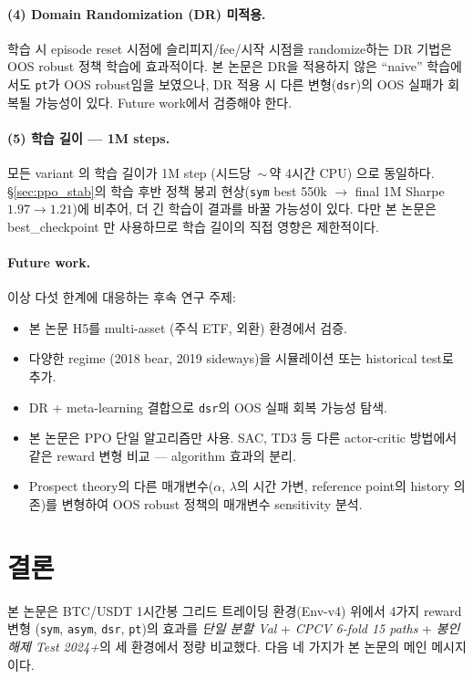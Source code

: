 \documentclass[11pt, a4paper]{article}
\begin{document}
\paragraph{(4) Domain Randomization (DR) 미적용.}
학습 시 episode reset 시점에 슬리피지/fee/시작 시점을 randomize하는 DR 기법은
OOS robust 정책 학습에 효과적이다. 본 논문은 DR을 적용하지 않은 ``naive''
학습에서도 \texttt{pt}가 OOS robust임을 보였으나, DR 적용 시 다른 변형(\texttt{dsr})의
OOS 실패가 회복될 가능성이 있다. Future work에서 검증해야 한다.

\paragraph{(5) 학습 길이 — 1M steps.}
모든 variant 의 학습 길이가 1M step (시드당 \,$\sim$\,약 4시간 CPU) 으로 동일하다.
\S\ref{sec:ppo_stab}의 학습 후반 정책 붕괴 현상(\texttt{sym} best 550k $\to$
final 1M Sharpe $1.97 \to 1.21$)에 비추어, 더 긴 학습이 결과를 바꿀 가능성이
있다. 다만 본 논문은 best\_checkpoint 만 사용하므로 학습 길이의 직접 영향은
제한적이다.

\paragraph{Future work.}
이상 다섯 한계에 대응하는 후속 연구 주제:
\begin{itemize}[leftmargin=*]
\item 본 논문 H5를 multi-asset (주식 ETF, 외환) 환경에서 검증.
\item 다양한 regime (2018 bear, 2019 sideways)을 시뮬레이션 또는 historical
test로 추가.
\item DR + meta-learning 결합으로 \texttt{dsr}의 OOS 실패 회복 가능성 탐색.
\item 본 논문은 PPO 단일 알고리즘만 사용. SAC, TD3 등 다른 actor-critic
방법에서 같은 reward 변형 비교 — algorithm 효과의 분리.
\item Prospect theory의 다른 매개변수($\alpha$, $\lambda$의 시간 가변, reference
point의 history 의존)를 변형하여 OOS robust 정책의 매개변수 sensitivity 분석.
\end{itemize}

\section{결론}
\label{sec:conclusion}

본 논문은 BTC/USDT 1시간봉 그리드 트레이딩 환경(Env-v4) 위에서 4가지 reward 변형
(\texttt{sym}, \texttt{asym}, \texttt{dsr}, \texttt{pt})의 효과를 \emph{단일 분할
Val} + \emph{CPCV 6-fold 15 paths} + \emph{봉인 해제 Test 2024+}의 세 환경에서
정량 비교했다. 다음 네 가지가 본 논문의 메인 메시지이다.
\end{document}
